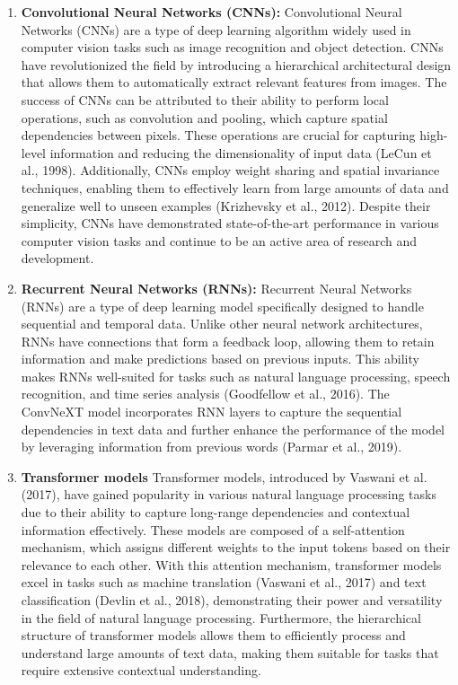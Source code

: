 \documentclass[12pt,oneside]{report}
\begin{document}
\begin{enumerate}
\item \textbf{Convolutional Neural Networks (CNNs):}
Convolutional Neural Networks (CNNs) are a type of deep learning algorithm widely used in computer vision tasks such as image recognition and object detection. CNNs have revolutionized the field by introducing a hierarchical architectural design that allows them to automatically extract relevant features from images. The success of CNNs can be attributed to their ability to perform local operations, such as convolution and pooling, which capture spatial dependencies between pixels. These operations are crucial for capturing high-level information and reducing the dimensionality of input data (LeCun et al., 1998). Additionally, CNNs employ weight sharing and spatial invariance techniques, enabling them to effectively learn from large amounts of data and generalize well to unseen examples (Krizhevsky et al., 2012). Despite their simplicity, CNNs have demonstrated state-of-the-art performance in various computer vision tasks and continue to be an active area of research and development.

\item \textbf{Recurrent Neural Networks (RNNs):}
Recurrent Neural Networks (RNNs) are a type of deep learning model specifically designed to handle sequential and temporal data. Unlike other neural network architectures, RNNs have connections that form a feedback loop, allowing them to retain information and make predictions based on previous inputs. This ability makes RNNs well-suited for tasks such as natural language processing, speech recognition, and time series analysis (Goodfellow et al., 2016). The ConvNeXT model incorporates RNN layers to capture the sequential dependencies in text data and further enhance the performance of the model by leveraging information from previous words (Parmar et al., 2019).

\item \textbf{Transformer models}
Transformer models, introduced by Vaswani et al. (2017), have gained popularity in various natural language processing tasks due to their ability to capture long-range dependencies and contextual information effectively. These models are composed of a self-attention mechanism, which assigns different weights to the input tokens based on their relevance to each other. With this attention mechanism, transformer models excel in tasks such as machine translation (Vaswani et al., 2017) and text classification (Devlin et al., 2018), demonstrating their power and versatility in the field of natural language processing. Furthermore, the hierarchical structure of transformer models allows them to efficiently process and understand large amounts of text data, making them suitable for tasks that require extensive contextual understanding.

\end{enumerate}
\end{document}
